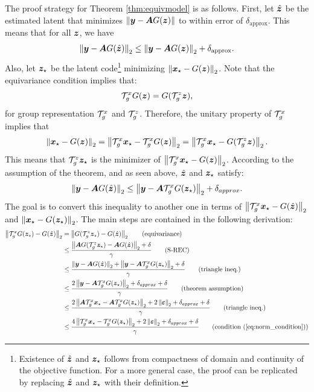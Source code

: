 The proof strategy for Theorem \ref{thm:equivmodel} is as follows. First, let $\hat{{\bm{z}}}$ be the estimated latent that minimizes $\left\|{\bm{y}}-{\bm{A}} G({\bm{z}})\right\|$ to within error of $\delta_{\text{approx}}$. This means that for all ${\bm{z}}$, we have
\[
\left\|{\bm{y}}-{\bm{A}} G(\hat{{\bm{z}}})\right\|_2\leq \left\|{\bm{y}}-{\bm{A}} G({{\bm{z}}})\right\|_2 +\delta_{\text{approx}}.
\]
Also, let ${\bm{z}}_\star$ be the latent code\footnote{Existence of $\hat{{\bm{z}}}$ and ${\bm{z}}_\star$ follows from compactness of domain and continuity of the objective function. For a more general case, the proof can be replicated by replacing $\hat{{\bm{z}}}$ and ${\bm{z}}_\star$ with their definition.} minimizing $\left\|{\bm{x}}_\star- G({\bm{z}})\right\|_2$. Note that the equivariance condition implies that:
\[
{\mathcal{T}}_g^x G({\bm{z}}) =  G({\mathcal{T}}_g^z{\bm{z}}),
\]
for group representation ${\mathcal{T}}_g^x$ and ${\mathcal{T}}_g^z$. Therefore, the unitary property of ${\mathcal{T}}_g^x$ implies that 
\[
\left\|{\bm{x}}_\star- G({\bm{z}})\right\|_2 = \left\|{\mathcal{T}}_g^x{\bm{x}}_\star- {\mathcal{T}}_g^x G({\bm{z}})\right\|_2 = 
 \left\|{\mathcal{T}}_g^x{\bm{x}}_\star- G({\mathcal{T}}_g^z{\bm{z}})\right\|_2.
\]
This means that ${\mathcal{T}}_g^z{\bm{z}}_\star$ is the minimizer of $ \left\|{\mathcal{T}}_g^x{\bm{x}}_\star- G({\bm{z}})\right\|_2$. According to the assumption of the theorem, and as seen above,  $\hat{{\bm{z}}}$ and ${\bm{z}}_\star$ satisfy:
\[
\left\|{\bm{y}}-{\bm{A}} G(\hat{{\bm{z}}})\right\|_2\leq \left\|{\bm{y}}-{\bm{A}}{\mathcal{T}}_g^x G({\bm{z}}_\star)\right\|_2+\delta_{approx}.
\]
The goal is to convert this inequality to another one in terms of $\left\|{\mathcal{T}}_g^x{\bm{x}}_\star- G(\hat{{\bm{z}}})\right\|_2$ and $\left\|{\bm{x}}_\star-G({\bm{z}}_\star)\right\|_2$. The main steps are contained in the following derivation:
\begin{align}
    \norm{\gT_g^x G(\vz_\star)- G(\hat{\vz})}_2&=
    \norm{ G(\gT_g^z\vz_\star)- G(\hat{\vz})}_2 \tag{equivariance}
    \\
    &\leq \frac{\norm{\mA G(\gT_g^z\vz_\star)-\mA G(\hat{\vz})}_2+ \delta}{\gamma}\tag{$\srec$}\\
    &\leq \frac{ 
    \norm{\vy-\mA G(\hat{\vz})}_2 
    +\norm{\vy-\mA \gT_g^x G(\vz_\star)}_2 + \delta
    }{\gamma}
    \tag{triangle ineq.}\\
    &\leq \frac{ 
    2\norm{\vy-\mA \gT_g^x G(\vz_\star)}_2 +\delta_{approx}+ \delta
    }{\gamma}
    \tag{theorem assumption}\\
    &\leq \frac{ 
    2\norm{\mA\gT_g^x\vx_\star-\mA \gT_g^x G(\vz_\star)}_2 +2\norm{\vepsilon}_2+\delta_{approx}+ \delta
    }{\gamma}
    \tag{triangle ineq.}\\
    &\leq \frac{ 
    4\norm{\gT_g^x\vx_\star- \gT_g^x G(\vz_\star)}_2 +2\norm{\vepsilon}_2+\delta_{approx}+ \delta
    }{\gamma}\tag{condition (\ref{eq:norm_condition})}
\end{align}

